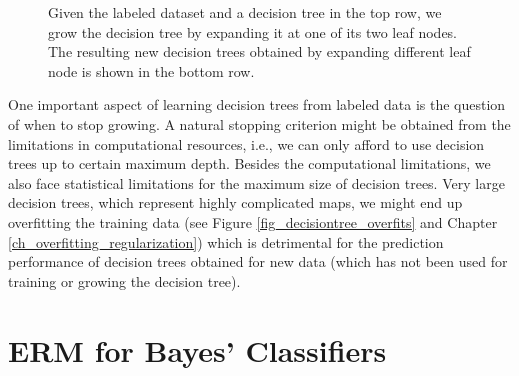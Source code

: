 \documentclass[12pt]{report}
\begin{document}
\begin{figure}[htbp]
\begin{minipage}{0.25\textwidth}
{}
\end{minipage}
\caption{Given the labeled dataset and a decision tree in the top row, 
	we grow the decision tree by expanding it at one of 
	its two leaf nodes. The resulting new decision trees 
	obtained by expanding different leaf node is shown 
	in the bottom row.}
\label{fig_growingatree}
\end{figure}
 
One important aspect of learning decision trees from labeled 
data is the question of when to stop growing. A natural stopping 
criterion might be obtained from the limitations in computational 
resources, i.e., we can only afford to use decision trees up to 
certain maximum depth. Besides the computational limitations, 
we also face statistical limitations for the maximum size of decision 
trees. Very large decision trees, which represent 
highly complicated maps, we might end up overfitting the training 
data (see Figure \ref{fig_decisiontree_overfits} and Chapter \ref{ch_overfitting_regularization}) 
which is detrimental for the prediction performance of decision 
trees obtained for new data (which has not been used for training 
or growing the decision tree). 
 
 \section{ERM for Bayes' Classifiers} 
 \label{sec_ERM_Bayes} 
 
\end{document}
